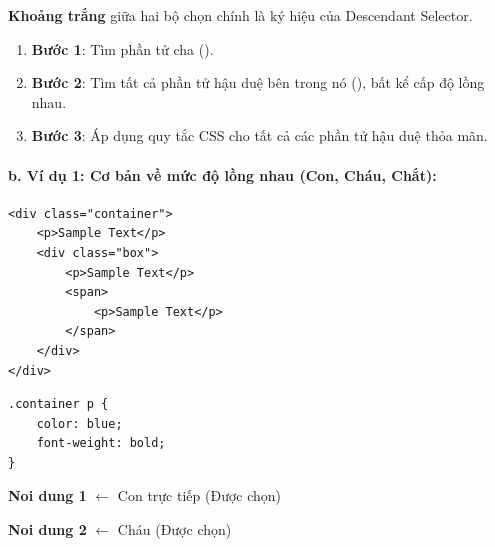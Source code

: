 \begin{noteBox}
\textbf{Khoảng trắng} giữa hai bộ chọn chính là ký hiệu của Descendant Selector.
\begin{enumerate}[leftmargin=1.5em, itemsep=2pt, parsep=0pt]
    \item \textbf{Bước 1}: Tìm phần tử cha ().
    \item \textbf{Bước 2}: Tìm tất cả phần tử hậu duệ bên trong nó (), bất kể cấp độ lồng nhau.
    \item \textbf{Bước 3}: Áp dụng quy tắc CSS cho tất cả các phần tử hậu duệ thỏa mãn.
\end{enumerate}
\end{noteBox}

\paragraph{b. Ví dụ 1: Cơ bản về mức độ lồng nhau (Con, Cháu, Chắt):}
\begin{codeWindow}
\begin{lstlisting}[language=HTML5]
<div class="container">
    <p>Sample Text</p>
    <div class="box">
        <p>Sample Text</p>
        <span>
            <p>Sample Text</p>
        </span>
    </div>
</div>
\end{lstlisting}

\begin{lstlisting}[language=CSS3]
.container p {
    color: blue;
    font-weight: bold;
}
\end{lstlisting}
\end{codeWindow}

\begin{browserWindow}
\sffamily\small
\begin{tcolorbox}[arc=2pt, colback=primaryBlue!5, colframe=primaryBlue!40, boxrule=1pt, title={\sffamily\small\color{white}\textbf{.container}}, colbacktitle=primaryBlue!70]
\textcolor{primaryBlue}{\textbf{Noi dung 1}} {\small\textcolor{gray!60}{$\leftarrow$ Con trực tiếp (Được chọn)}} \par\vspace{3pt}
\begin{tcolorbox}[arc=2pt, colback=white, colframe=primaryBlue!30, boxrule=1pt, title={\sffamily\scriptsize\color{darkText}.box}]
\textcolor{primaryBlue}{\textbf{Noi dung 2}} {\small\textcolor{gray!60}{$\leftarrow$ Cháu (Được chọn)}} \par\vspace{2pt}
\end{tcolorbox}
\end{tcolorbox}
\end{browserWindow}

